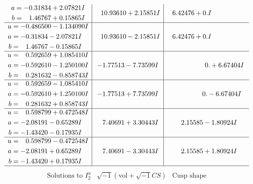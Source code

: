 \documentclass[1p]{elsarticle_modified}
\theoremstyle{definition}
\newcommand{\I}{\sqrt{-1}}
\begin{document}
$$\begin{array}{c|c|c}
\begin{aligned}
a &= -0.31834 + 2.07821 I \\
b &= \phantom{-}1.46767 + 0.15865 I\end{aligned}
 & \phantom{-}10.93610 + 2.15851 I & \phantom{-}6.42476 + 0. I\phantom{ +0.000000I} \\ \hline\begin{aligned}
u &= -0.486500 - 1.134090 I \\
a &= -0.31834 - 2.07821 I \\
b &= \phantom{-}1.46767 - 0.15865 I\end{aligned}
 & \phantom{-}10.93610 - 2.15851 I & \phantom{-}6.42476 + 0. I\phantom{ +0.000000I} \\ \hline\begin{aligned}
u &= \phantom{-}0.592659 + 1.085410 I \\
a &= -0.592610 - 1.250100 I \\
b &= \phantom{-}0.281632 - 0.858743 I\end{aligned}
 & -1.77513 - 7.73599 I & \phantom{-0.000000 -}0. + 6.67404 I \\ \hline\begin{aligned}
u &= \phantom{-}0.592659 - 1.085410 I \\
a &= -0.592610 + 1.250100 I \\
b &= \phantom{-}0.281632 + 0.858743 I\end{aligned}
 & -1.77513 + 7.73599 I & \phantom{-0.000000 } 0. - 6.67404 I \\ \hline\begin{aligned}
u &= \phantom{-}0.598799 + 0.472548 I \\
a &= -2.08191 - 0.65289 I \\
b &= -1.43420 - 0.17935 I\end{aligned}
 & \phantom{-}7.40691 + 3.30443 I & \phantom{-}2.15585 - 1.80924 I \\ \hline\begin{aligned}
u &= \phantom{-}0.598799 - 0.472548 I \\
a &= -2.08191 + 0.65289 I \\
b &= -1.43420 + 0.17935 I\end{aligned}
 & \phantom{-}7.40691 - 3.30443 I & \phantom{-}2.15585 + 1.80924 I\\
 \hline 
 \end{array}$$\newpage$$\begin{array}{c|c|c}  
\text{Solutions to }I^u_{2}& \I (\text{vol} + \sqrt{-1}CS) & \text{Cusp shape}\\
 \hline 
\begin{aligned}

\end{aligned}
\end{array}$$
\end{document}
